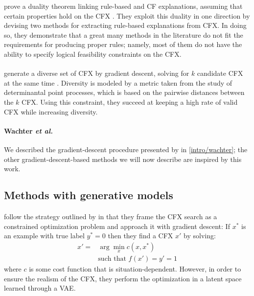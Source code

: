 \documentclass[../main.tex]{subfiles}
\begin{document}
\citeauthor{gengComputing2022} prove a duality theorem linking rule-based and CF explanations, assuming that certain properties hold on the CFX \cite{gengComputing2022}.
They exploit this duality in one direction by devising two methods for extracting rule-based explanations from CFX.
In doing so, they demonstrate that a great many methods in the literature do not fit the requirements for producing proper rules; namely, most of them do not have the ability to specify logical feasibility constraints on the CFX.

\paragraph{}

\citeauthor{mothilalExplaining2020} generate a diverse set of CFX by gradient descent, solving for $k$ candidate CFX at the same time \cite{mothilalExplaining2020}.
Diversity is modeled by a metric taken from the study of determinantal point processes, which is based on the pairwise distances between the $k$ CFX.
Using this constraint, they succeed at keeping a high rate of valid CFX while increasing diversity.

\paragraph{Wachter \textsl{et al.}}

We described the gradient-descent procedure presented by \citeauthor{wachterCounterfactual2017} \cite{wachterCounterfactual2017} in \autoref{intro/wachter};
the other gradient-descent-based methods we will now describe are inspired by this work.

\subsection{Methods with generative models}

\paragraph{\revise}
\label{par:revise}

\citeauthor{joshiRealistic2019} follow the strategy outlined by \citeauthor{wachterCounterfactual2017} in that they frame the CFX search as a constrained optimization problem and approach it with gradient descent:
If $x^{*}$ is an example with true label $y^{*} = 0$ then they find a CFX $x'$ by solving:
\begin{align*}
	x' = & \arg\min_{x} c(x, x^{*})              \\
	     & \text{such that } f(x') = y' = 1
\end{align*}
where $c$ is some cost function that is situation-dependent.
However, in order to ensure the realism of the CFX, they perform the optimization in a latent space learned through a VAE.
\end{document}
